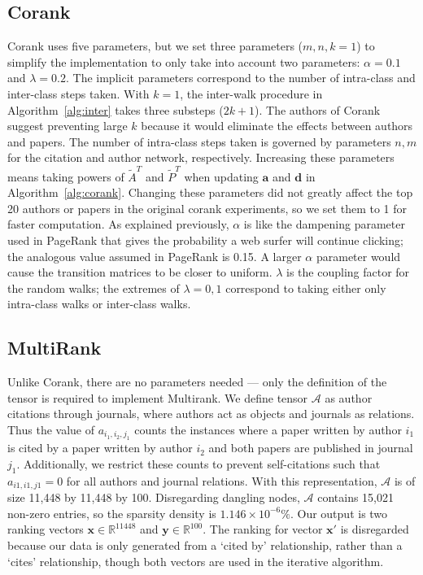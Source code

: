 \subsection{Corank}
Corank uses five parameters, but we set three parameters ($m,n,k = 1$) to simplify the implementation to only take into account two parameters: $\alpha = 0.1$ and $\lambda = 0.2$. The implicit parameters correspond to the number of intra-class and inter-class steps taken. With $k=1$, the inter-walk procedure in Algorithm~\ref{alg:inter} takes three substeps ($2k+1$). The authors of Corank suggest preventing large $k$ because it would eliminate the effects between authors and papers. The number of intra-class steps taken is governed by parameters $n,m$ for the citation and author network, respectively. Increasing these parameters means taking powers of $\tilde{A}^T$ and $\tilde{P}^T$ when updating $\mathbf{a}$ and $\mathbf{d}$ in Algorithm~\ref{alg:corank}. Changing these parameters did not greatly affect the top 20 authors or papers in the original corank experiments, so we set them to 1 for faster computation. As explained previously, $\alpha$ is like the dampening parameter used in PageRank that gives the probability a web surfer will continue clicking; the analogous value assumed in PageRank is 0.15. A larger $\alpha$ parameter would cause the transition matrices to be closer to uniform. $\lambda$ is the coupling factor for the random walks; the extremes of $\lambda=0,1$ correspond to taking either only intra-class walks or inter-class walks. 


\subsection{MultiRank}
Unlike Corank, there are no parameters needed --- only the definition of the tensor is required to implement Multirank. We define tensor $\mathcal{A}$ as author citations through journals, where authors act as objects and journals as relations. Thus the value of $a_{i_1,i_2,j_1}$ counts the instances where a paper written by author $i_1$ is cited by a paper written by author $i_2$ and both papers are published in journal $j_1$. Additionally, we restrict these counts to prevent self-citations such that $a_{i1,i1,j1} = 0$ for all authors and journal relations. With this representation, $\mathcal{A}$ is of size 11,448 by 11,448 by 100. Disregarding dangling nodes, $\mathcal{A}$ contains 15,021 non-zero entries, so the sparsity density is $1.146 \times 10^{-6} \%$. Our output is two ranking vectors $\mathbf{x}\in \mathbb{R}^{11448}$ and $\mathbf{y} \in \mathbb{R}^{100}$. The ranking for vector $\mathbf{x'}$ is disregarded because our data is only generated from a `cited by' relationship, rather than a `cites' relationship, though both vectors are used in the iterative algorithm. 

